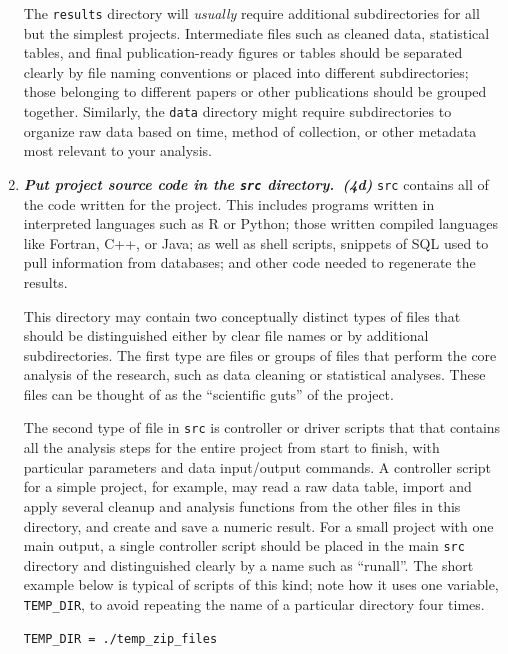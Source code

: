 \documentclass[10pt,letterpaper]{article}
\newcommand{\practice}[2]{\textbf{\emph{{#2}~({#1})}}}
\begin{document}
\begin{enumerate}
  The \texttt{results} directory will \emph{usually} require
  additional subdirectories for all but the simplest
  projects. Intermediate files such as cleaned data, statistical
  tables, and final publication-ready figures or tables should be
  separated clearly by file naming conventions or placed into
  different subdirectories; those belonging to different papers or
  other publications should be grouped together. Similarly, the
  \texttt{data} directory might require subdirectories to organize raw
  data based on time, method of collection, or other metadata most
  relevant to your analysis.

\item

  \practice{4d}{Put project source code in the \texttt{src}
  directory.}  \texttt{src} contains all of the code written for the
  project. This includes programs written in interpreted languages
  such as R or Python; those written compiled languages like Fortran,
  C++, or Java; as well as shell scripts, snippets of SQL used to pull
  information from databases; and other code needed to regenerate the
  results.

  This directory may contain two conceptually distinct types of files
  that should be distinguished either by clear file names or by
  additional subdirectories. The first type are files or groups of
  files that perform the core analysis of the research, such as data
  cleaning or statistical analyses.  These files can be thought of as
  the ``scientific guts'' of the project.

  The second type of file in \texttt{src} is controller or driver
  scripts that that contains all the analysis steps for the entire
  project from start to finish, with particular parameters and data
  input/output commands. A controller script for a simple project, for
  example, may read a raw data table, import and apply several cleanup
  and analysis functions from the other files in this directory, and
  create and save a numeric result. For a small project with one main
  output, a single controller script should be placed in the main
  \texttt{src} directory and distinguished clearly by a name such as
  ``runall''.  The short example below is typical of scripts of this
  kind; note how it uses one variable, \texttt{TEMP\_DIR}, to avoid
  repeating the name of a particular directory four times.

{\small
\begin{verbatim}
TEMP_DIR = ./temp_zip_files


\end{verbatim}}
\end{enumerate}
\end{document}

